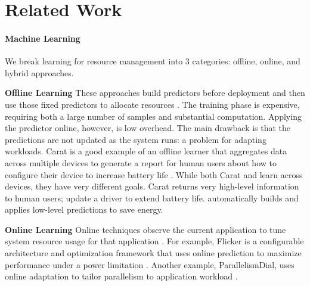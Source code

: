\section{Related Work}

\paragraph{Machine Learning}

We break learning for resource management into 3 categories: offline,
online, and hybrid approaches.

\noindent \textbf{Offline Learning} These approaches build predictors
before deployment and then use those fixed predictors to allocate
resources
\cite{Yi2003,LeeBrooks2006,CPR,ChenJohn2011,petabricksStatic}.  The
training phase is expensive, requiring both a large number of
samples and substantial computation.  Applying the predictor online,
however, is low overhead.  The main drawback is that the predictions are
not updated as the system runs: a problem for adapting workloads.
  Carat is a good example of an
offline learner that aggregates data across multiple devices to
generate a report for human users about how to configure their device
to increase battery life \cite{carat}.  While both Carat and \SYSTEM{}
learn across devices, they have very different goals.  Carat returns
very high-level information to human users; \eg{} update a driver to
extend battery life.  \SYSTEM{} automatically builds and applies
low-level predictions to save energy.

\noindent \textbf{Online Learning} Online techniques observe the
current application to tune system resource usage for that application
\cite{Li2006,Flicker,ParallelismDial,Ponamarev,petabricksDynamic,LeeBrooks}.
For example, Flicker is a configurable architecture and optimization
framework that uses online prediction to maximize performance under a
power limitation \cite{Flicker}.  Another example, ParallelismDial,
uses online adaptation to tailor parallelism to application workload
\cite{ParallelismDial}.



